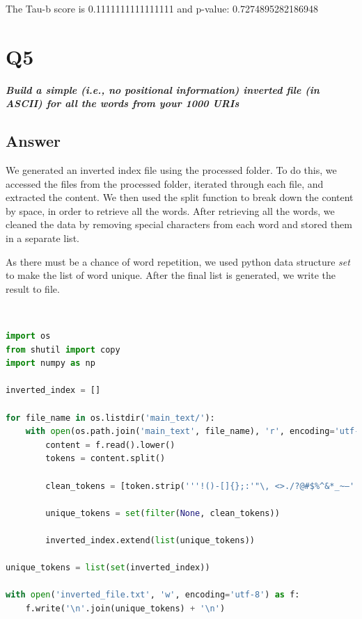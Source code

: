 \documentclass[12pt]{article}
\begin{document}
The Tau-b score is 0.1111111111111111 and p-value:  0.7274895282186948


\clearpage


\section*{Q5}

\emph{ \textbf{Build a simple (i.e., no positional information) inverted file (in ASCII) for all the words from your 1000 URIs}}

\subsection*{Answer}
We generated an inverted index file using the processed folder. To do this, we accessed the files from the processed folder, iterated through each file, and extracted the content. We then used the split function to break down the content by space, in order to retrieve all the words. After retrieving all the words, we cleaned the data by removing special characters from each word and stored them in a separate list.

As there must be a chance of word repetition, we used python data structure \textit{set} to make the list of word unique. After the final list is generated, we write the result to file.


\\

\begin{lstlisting}[language=Python, caption=Implementation for creating inverted index file]
import os
from shutil import copy
import numpy as np

inverted_index = []

for file_name in os.listdir('main_text/'):
    with open(os.path.join('main_text', file_name), 'r', encoding='utf-8') as f:
        content = f.read().lower()
        tokens = content.split()

        clean_tokens = [token.strip('''!()-[]{};:'"\, <>./?@#$%^&*_~–''') for token in tokens]

        unique_tokens = set(filter(None, clean_tokens))

        inverted_index.extend(list(unique_tokens))

unique_tokens = list(set(inverted_index))

with open('inverted_file.txt', 'w', encoding='utf-8') as f:
    f.write('\n'.join(unique_tokens) + '\n')


\end{lstlisting}
\end{document}
